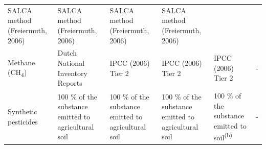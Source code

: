 \documentclass[openany]{book}
\begin{document}
\begin{longtable}[]{@{}llllll@{}}
\begin{minipage}[t]{0.12\columnwidth}
SALCA method (Freiermuth, 2006)\strut
\end{minipage} & \begin{minipage}[t]{0.13\columnwidth}\raggedright
SALCA method (Freiermuth, 2006)\strut
\end{minipage} & \begin{minipage}[t]{0.12\columnwidth}\raggedright
SALCA method (Freiermuth, 2006)\strut
\end{minipage} & \begin{minipage}[t]{0.17\columnwidth}\raggedright
SALCA method (Freiermuth, 2006)\strut
\end{minipage}\tabularnewline
\begin{minipage}[t]{0.12\columnwidth}\raggedright
Methane (CH\textsubscript{4})\strut
\end{minipage} & \begin{minipage}[t]{0.16\columnwidth}\raggedright
Dutch National Inventory Reports\strut
\end{minipage} & \begin{minipage}[t]{0.12\columnwidth}\raggedright
IPCC (2006) Tier 2\strut
\end{minipage} & \begin{minipage}[t]{0.13\columnwidth}\raggedright
IPCC (2006) Tier 2\strut
\end{minipage} & \begin{minipage}[t]{0.12\columnwidth}\raggedright
IPCC (2006) Tier 2\strut
\end{minipage} & \begin{minipage}[t]{0.17\columnwidth}\raggedright
-\strut
\end{minipage}\tabularnewline
\begin{minipage}[t]{0.12\columnwidth}\raggedright
Synthetic pesticides\strut
\end{minipage} & \begin{minipage}[t]{0.16\columnwidth}\raggedright
100 \% of the substance emitted to agricultural soil\strut
\end{minipage} & \begin{minipage}[t]{0.12\columnwidth}\raggedright
100 \% of the substance emitted to agricultural soil\strut
\end{minipage} & \begin{minipage}[t]{0.13\columnwidth}\raggedright
100 \% of the substance emitted to agricultural soil\strut
\end{minipage} & \begin{minipage}[t]{0.12\columnwidth}\raggedright
100 \% of the substance emitted to soil\textsuperscript{(b)}\strut
\end{minipage} & \begin{minipage}[t]{0.17\columnwidth}\raggedright
-\strut
\end{minipage}\tabularnewline
\bottomrule
\end{longtable}
\end{document}
